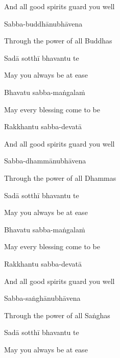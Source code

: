 \begin{cprenglish}
  And all good spirits guard you well
\end{cprenglish}

Sabba-buddhānubhāvena

\begin{cprenglish}
  Through the power of all Buddhas
\end{cprenglish}

Sadā sotthī bhavantu te

\begin{cprenglish}
  May you always be at ease
\end{cprenglish}

Bhavatu sabba-maṅgalaṁ

\begin{cprenglish}
  May every blessing come to be
\end{cprenglish}

Rakkhantu sabba-devatā

\begin{cprenglish}
  And all good spirits guard you well
\end{cprenglish}

Sabba-dhammānubhāvena

\begin{cprenglish}
  Through the power of all Dhammas
\end{cprenglish}

Sadā sotthī bhavantu te

\begin{cprenglish}
  May you always be at ease
\end{cprenglish}

Bhavatu sabba-maṅgalaṁ

\begin{cprenglish}
  May every blessing come to be
\end{cprenglish}

Rakkhantu sabba-devatā

\begin{cprenglish}
  And all good spirits guard you well
\end{cprenglish}

Sabba-saṅghānubhāvena

\begin{cprenglish}
  Through the power of all Saṅghas
\end{cprenglish}

Sadā sotthī bhavantu te

\begin{cprenglish}
  May you always be at ease\\
\end{cprenglish}


